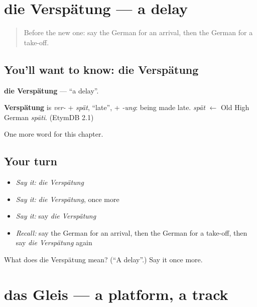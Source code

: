 \section[die Verspätung]{die Verspätung — a delay}

\label{lesson:GE-C192-verspaetung}



\begin{quote}
Before the new one: say the German for an arrival, then the German for a take-off.
\end{quote}

\subsection*{You'll want to know: die Verspätung}
\textbf{die Verspätung} — \textquotedblleft{}a delay\textquotedblright{}.

\begin{cousinweb}
\textbf{Verspätung} is \emph{ver-} + \emph{spät}, \textquotedblleft{}late\textquotedblright{}, + \emph{-ung}: being made late. \emph{spät} $\leftarrow$ Old High German \emph{spāti}. (EtymDB 2.1)
\end{cousinweb}

\begin{grammarlens}[title={What you've built}]
One more word for this chapter.
\end{grammarlens}

\subsection*{Your turn}
\begin{itemize}
\raggedright
  \item \emph{Say it:} \emph{die Verspätung}
  \item \emph{Say it:} \emph{die Verspätung}, once more
  \item \emph{Say it:} say \emph{die Verspätung}
  \item \emph{Recall:} say the German for an arrival, then the German for a take-off, then say \emph{die Verspätung} again
\end{itemize}

\begin{tcolorbox}[breakable,colback=teal!4,colframe=teal!35!black,title={Before you move on}]
What does die Verspätung mean? (\textquotedblleft{}A delay\textquotedblright{}.) Say it once more.
\end{tcolorbox}
\section[das Gleis]{das Gleis — a platform, a track}

